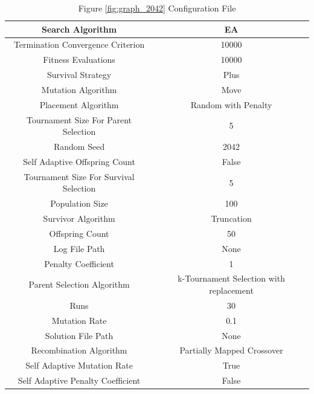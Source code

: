 \documentclass{standalone}
\begin{document}
\begin{table}[!htb]
	\centering
	\caption{Figure \ref{fig:graph_2042} Configuration File}
	\label{tab:graph_2042}
	\begin{tabular}{| c | c |}
		\hline
		Search Algorithm		& EA		 \\
		\hline
		Termination Convergence Criterion		& 10000		 \\
		\hline
		Fitness Evaluations		& 10000		 \\
		\hline
		Survival Strategy		& Plus		 \\
		\hline
		Mutation Algorithm		& Move		 \\
		\hline
		Placement Algorithm		& Random with Penalty		 \\
		\hline
		Tournament Size For Parent Selection		& 5		 \\
		\hline
		Random Seed		& 2042		 \\
		\hline
		Self Adaptive Offspring Count		& False		 \\
		\hline
		Tournament Size For Survival Selection		& 5		 \\
		\hline
		Population Size		& 100		 \\
		\hline
		Survivor Algorithm		& Truncation		 \\
		\hline
		Offspring Count		& 50		 \\
		\hline
		Log File Path		& None		 \\
		\hline
		Penalty Coefficient		& 1		 \\
		\hline
		Parent Selection Algorithm		& k-Tournament Selection with replacement		 \\
		\hline
		Runs		& 30		 \\
		\hline
		Mutation Rate		& 0.1		 \\
		\hline
		Solution File Path		& None		 \\
		\hline
		Recombination Algorithm		& Partially Mapped Crossover		 \\
		\hline
		Self Adaptive Mutation Rate		& True		 \\
		\hline
		Self Adaptive Penalty Coefficient		& False		 \\
		\hline
	\end{tabular}
\end{table}
\end{document}
